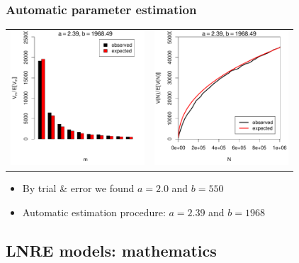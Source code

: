 \documentclass[handout,notes=show,t]{beamer} %
\begin{document}
\begin{frame}
  \frametitle{Automatic parameter estimation}

  \begin{center}
    \begin{tabular}{c @{} c}
      \includegraphics[width=50mm]{img/05-estimation-spc-estimated} &
      \includegraphics[width=50mm]{img/05-estimation-vgc-estimated} 
    \end{tabular}
  \end{center}

  \ungap[1]
  \begin{itemize}
    \item By trial \& error we found $a=2.0$ and $b=550$
    \item Automatic estimation procedure: $a=2.39$ and $b=1968$
  \end{itemize}
\end{frame}


\subsection{LNRE models: mathematics}
\end{document}
